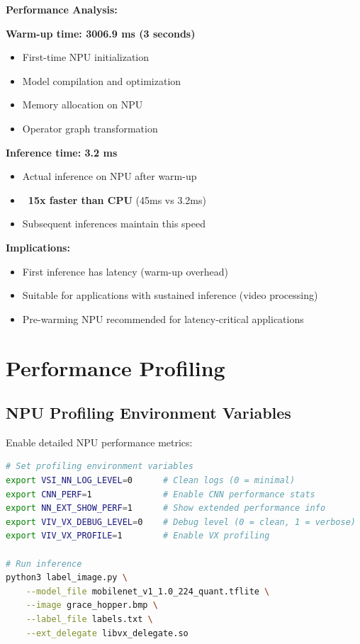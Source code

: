 \documentclass[12pt,a4paper]{report}
\begin{document}
\begin{important}
\textbf{Performance Analysis:}

\textbf{Warm-up time: 3006.9 ms (3 seconds)}
\begin{itemize}
    \item First-time NPU initialization
    \item Model compilation and optimization
    \item Memory allocation on NPU
    \item Operator graph transformation
\end{itemize}

\textbf{Inference time: 3.2 ms}
\begin{itemize}
    \item Actual inference on NPU after warm-up
    \item \textbf{~15x faster than CPU} (45ms vs 3.2ms)
    \item Subsequent inferences maintain this speed
\end{itemize}

\textbf{Implications:}
\begin{itemize}
    \item First inference has latency (warm-up overhead)
    \item Suitable for applications with sustained inference (video processing)
    \item Pre-warming NPU recommended for latency-critical applications
\end{itemize}
\end{important}

\section{Performance Profiling}

\subsection{NPU Profiling Environment Variables}

Enable detailed NPU performance metrics:

\begin{lstlisting}[language=bash]
# Set profiling environment variables
export VSI_NN_LOG_LEVEL=0      # Clean logs (0 = minimal)
export CNN_PERF=1              # Enable CNN performance stats
export NN_EXT_SHOW_PERF=1      # Show extended performance info
export VIV_VX_DEBUG_LEVEL=0    # Debug level (0 = clean, 1 = verbose)
export VIV_VX_PROFILE=1        # Enable VX profiling

# Run inference
python3 label_image.py \
    --model_file mobilenet_v1_1.0_224_quant.tflite \
    --image grace_hopper.bmp \
    --label_file labels.txt \
    --ext_delegate libvx_delegate.so
\end{lstlisting}
\end{document}
